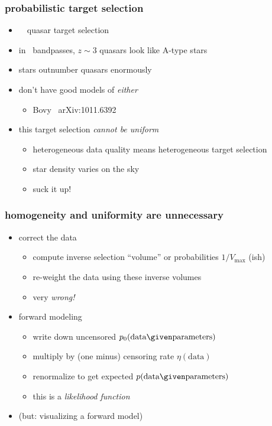 \documentclass[pdftex]{beamer}
\newcommand{\data}{\mbox{data}}
\newcommand{\pars}{\mbox{parameters}}
\begin{document}
\begin{frame}
  \frametitle{probabilistic target selection}
  \begin{itemize}
  \item \sdssiii\ \boss\ quasar target selection
  \item in \sdss\ bandpasses, $z\sim 3$ quasars look like A-type stars
  \item stars outnumber quasars enormously
  \item don't have good models of \emph{either}
    \begin{itemize}
    \item Bovy \etal\ arXiv:1011.6392
    \end{itemize}
  \item this target selection \emph{cannot be uniform}
    \begin{itemize}
    \item heterogeneous data quality means heterogeneous target selection
    \item star density varies on the sky
    \item suck it up!
    \end{itemize}
  \end{itemize}
\end{frame}

\begin{frame}
  \frametitle{homogeneity and uniformity are unnecessary}
  \begin{itemize}
  \item correct the data
    \begin{itemize}
    \item compute inverse selection ``volume'' or probabilities $1 / V_{\mathrm{max}}$ (ish)
    \item re-weight the data using these inverse volumes
    \item very \emph{wrong!}
    \end{itemize}
  \item forward modeling
    \begin{itemize}
    \item write down uncensored $p_0(\data\given\pars)$
    \item multiply by (one minus) censoring rate $\eta(\data)$
    \item renormalize to get expected $p(\data\given\pars)$
    \item this is a \emph{likelihood function}
    \end{itemize}
  \item (but: visualizing a forward model)
  \end{itemize}
\end{frame}
\end{document}
